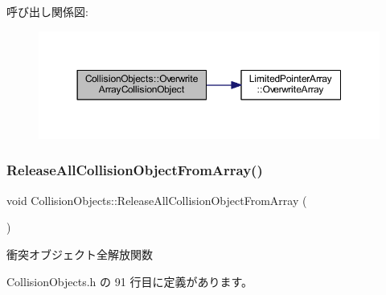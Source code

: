 呼び出し関係図\+:\nopagebreak
\begin{figure}[H]
\begin{center}
\leavevmode
\includegraphics[width=350pt]{class_collision_objects_aed8d6903485ae775d8bbff511796a653_cgraph}
\end{center}
\end{figure}
\mbox{\label{class_collision_objects_a2efe32f283fe9b2a30ff8d1e370f152d}} 
\subsubsection{\texorpdfstring{Release\+All\+Collision\+Object\+From\+Array()}{ReleaseAllCollisionObjectFromArray()}}
{\footnotesize\ttfamily void Collision\+Objects\+::\+Release\+All\+Collision\+Object\+From\+Array (\begin{DoxyParamCaption}{ }\end{DoxyParamCaption})\hspace{0.3cm}{\ttfamily [inline]}}



衝突オブジェクト全解放関数 



 Collision\+Objects.\+h の 91 行目に定義があります。

